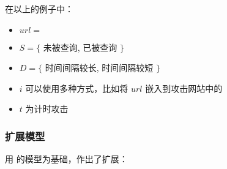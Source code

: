 在以上的例子中：

\begin{itemize}
    \item $url=$ 
    \item $S=\{$  未被查询,  已被查询 $\}$
    \item $D=\{$ 时间间隔较长, 时间间隔较短 $\}$
    \item $i$ 可以使用多种方式，比如将 $url$ 嵌入到攻击网站中的 
    \item $t$ 为计时攻击
\end{itemize}

\subsubsection{扩展模型 \cite{modelext}}

\citeauthor{modelext} 用 \citeauthor{modelbase} 的模型为基础，作出了扩展：

